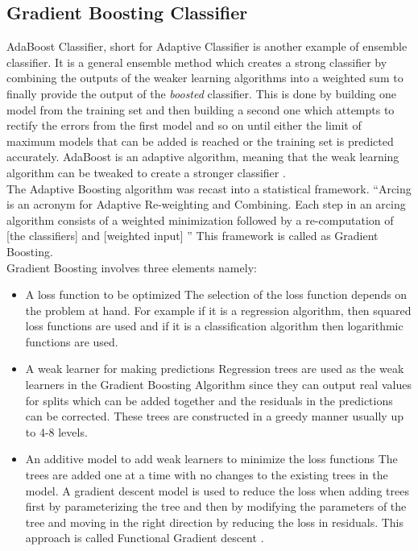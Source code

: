 \subsection{Gradient Boosting Classifier}
AdaBoost Classifier, short for Adaptive Classifier is another example of ensemble classifier. 
It is a general ensemble method which creates a strong classifier by combining the outputs of the weaker learning algorithms into a weighted sum to finally provide the output of the \emph{boosted} classifier. This is done by building one model from the training set and then building a second one which attempts to rectify the errors from the first model and so on until either the limit of maximum models that can be added is reached or the training set is predicted accurately. AdaBoost is an adaptive algorithm, meaning that the weak learning algorithm can be tweaked to create a stronger classifier \cite{link15}. \\
The Adaptive Boosting algorithm was recast into a statistical framework. ``Arcing is an acronym for Adaptive Re-weighting and Combining. Each step in an arcing algorithm consists of a weighted minimization followed by a re-computation of [the classifiers] and [weighted input] \cite{link15}''
This framework is called as Gradient Boosting. \\
Gradient Boosting involves three elements namely:
\begin{itemize}
 \item{A loss function to be optimized}
 The selection of the loss function depends on the problem at hand. For example if it is a regression algorithm, then squared loss functions are used and if it is a classification algorithm then logarithmic functions are used.
 \item{A weak learner for making predictions}
 Regression trees are used as the weak learners in the Gradient Boosting Algorithm since they can output real values for splits which can be added together and the residuals in the predictions can be corrected. These trees are constructed in a greedy manner usually up to 4-8 levels.
 \item{An additive model to add weak learners to minimize the loss functions}
 The trees are added one at a time with no changes to the existing trees in the model. A gradient descent model is used to reduce the loss when adding trees first by parameterizing the tree and then by modifying the parameters of the tree and moving in the right direction by reducing the loss in residuals. This approach is called Functional Gradient descent \cite{link15}.
\end{itemize}

